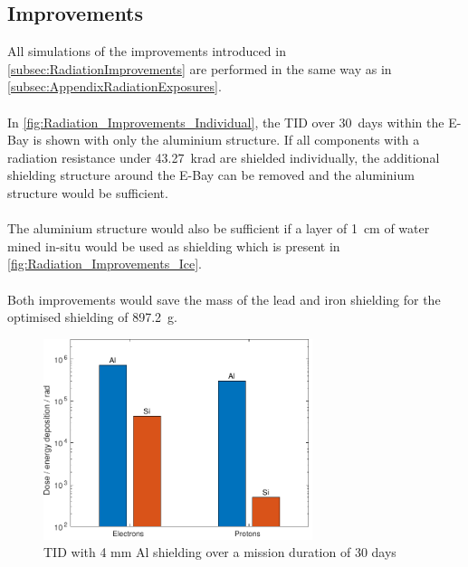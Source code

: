\newpage

\subsection{Improvements}

\label{app:AppendixRadiationImprovements}

All simulations of the improvements introduced in \autoref{subsec:RadiationImprovements} are performed in the same way as in \autoref{subsec:AppendixRadiationExposures}. \\ \\
In \autoref{fig:Radiation_Improvements_Individual}, the TID over 30~days within the E-Bay is shown with only the aluminium structure. If all components with a radiation resistance under 43.27~krad are shielded individually, the additional shielding structure around the E-Bay can be removed and the aluminium structure would be sufficient. \\ \\
The aluminium structure would also be sufficient if a layer of 1~cm of water mined in-situ would be used as shielding which is present in \autoref{fig:Radiation_Improvements_Ice}. \\ \\
Both improvements would save the mass of the lead and iron shielding for the optimised shielding of 897.2~g.

\begin{figure}[htp]
	\centering
	\includegraphics[width=0.7\textwidth]{Media/J_Improvements_Individual}
	\caption{TID with 4 mm Al shielding over a mission duration of 30 days}
	\label{fig:Radiation_Improvements_Individual}
\end{figure}


